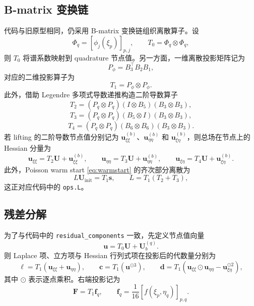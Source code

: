 \documentclass[11pt,a4paper]{article}
\begin{document}
\subsection{B-matrix 变换链}
代码与旧原型相同，仍采用 B-matrix 变换链组织离散算子。设
\[
\Phi_q=[\phi_j(\xi_p)]_{p,j},
\qquad
T_0=\Phi_q\otimes \Phi_q,
\]
则 $T_0$ 将谱系数映射到 quadrature 节点值。另一方面，一维离散投影矩阵记为
\[
P_\phi=B_3^\top B_2B_1,
\]
对应的二维投影算子为
\begin{equation}
T_1=P_\phi\otimes P_\phi.
\label{eq:T1}
\end{equation}
此外，借助 Legendre 多项式导数递推构造二阶导数算子
\begin{equation}
T_2=(P_q\otimes P_q)(I\otimes B_5)(B_3\otimes B_3),
\label{eq:T2}
\end{equation}
\begin{equation}
T_3=(P_q\otimes P_q)(B_5\otimes I)(B_3\otimes B_3),
\label{eq:T3}
\end{equation}
\begin{equation}
T_4=(P_q\otimes P_q)(B_6\otimes B_6)(B_3\otimes B_3).
\label{eq:T4}
\end{equation}
若 lifting 的二阶导数节点值分别记为 $\bm u^{(b)}_{\xi\xi}$、$\bm u^{(b)}_{\eta\eta}$ 和 $\bm u^{(b)}_{\xi\eta}$，则总场在节点上的 Hessian 分量为
\begin{equation}
\bm u_{\xi\xi}=T_2\bm U+\bm u^{(b)}_{\xi\xi},
\qquad
\bm u_{\eta\eta}=T_3\bm U+\bm u^{(b)}_{\eta\eta},
\qquad
\bm u_{\xi\eta}=T_4\bm U+\bm u^{(b)}_{\xi\eta}.
\label{eq:hessian}
\end{equation}
此外，Poisson warm start \eqref{eq:warmstart} 的齐次部分离散为
\begin{equation}
L\bm U_{\mathrm{init}}=T_1\bm s,
\qquad
L=T_1(T_2+T_3),
\label{eq:poisson-discrete}
\end{equation}
这正对应代码中的 \texttt{ops.L}。

\subsection{残差分解}
为了与代码中的 \texttt{residual\_components} 一致，先定义节点值向量
\[
\bm u=T_0\bm U+\bm U_b^{(q)}.
\]
则 Laplace 项、立方项与 Hessian 行列式项在投影后的代数量分别为
\begin{equation}
\bm \ell=T_1(\bm u_{\xi\xi}+\bm u_{\eta\eta}),
\qquad
\bm c=T_1(\bm u^{\odot 3}),
\qquad
\bm d=T_1(\bm u_{\xi\xi}\odot \bm u_{\eta\eta}-\bm u_{\xi\eta}^{\odot 2}),
\label{eq:components}
\end{equation}
其中 $\odot$ 表示逐点乘积。右端投影记为
\begin{equation}
\bm F=T_1\bm f_q,
\qquad
\bm f_q=\frac1{16}[f(\xi_p,\eta_q)]_{p,q}.
\label{eq:F}
\end{equation}
\end{document}
